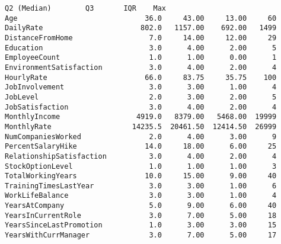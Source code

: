 \documentclass[11pt]{article}
\begin{document}
\begin{tcolorbox}[breakable, size=fbox, boxrule=.5pt, pad at break*=1mm, opacityfill=0]
\begin{Verbatim}[commandchars=\\\{\}]
                          Q2 (Median)        Q3       IQR    Max
Age                              36.0     43.00     13.00     60
DailyRate                       802.0   1157.00    692.00   1499
DistanceFromHome                  7.0     14.00     12.00     29
Education                         3.0      4.00      2.00      5
EmployeeCount                     1.0      1.00      0.00      1
EnvironmentSatisfaction           3.0      4.00      2.00      4
HourlyRate                       66.0     83.75     35.75    100
JobInvolvement                    3.0      3.00      1.00      4
JobLevel                          2.0      3.00      2.00      5
JobSatisfaction                   3.0      4.00      2.00      4
MonthlyIncome                  4919.0   8379.00   5468.00  19999
MonthlyRate                   14235.5  20461.50  12414.50  26999
NumCompaniesWorked                2.0      4.00      3.00      9
PercentSalaryHike                14.0     18.00      6.00     25
RelationshipSatisfaction          3.0      4.00      2.00      4
StockOptionLevel                  1.0      1.00      1.00      3
TotalWorkingYears                10.0     15.00      9.00     40
TrainingTimesLastYear             3.0      3.00      1.00      6
WorkLifeBalance                   3.0      3.00      1.00      4
YearsAtCompany                    5.0      9.00      6.00     40
YearsInCurrentRole                3.0      7.00      5.00     18
YearsSinceLastPromotion           1.0      3.00      3.00     15
YearsWithCurrManager              3.0      7.00      5.00     17
\end{Verbatim}
\end{tcolorbox}
        
\end{document}
